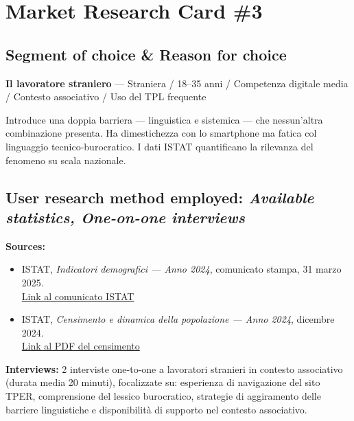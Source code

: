 ﻿\documentclass[11pt,a4paper]{article}
\begin{document}
\newpage
\section{Market Research Card \#3}

\subsection*{Segment of choice \& Reason for choice}
\begin{tcolorbox}[base]
\textbf{Il lavoratore straniero} --- Straniera / 18--35 anni /
Competenza digitale media / Contesto associativo / Uso del TPL
frequente

\vspace{0.2cm}
Introduce una doppia barriera --- linguistica e sistemica --- che
nessun'altra combinazione presenta. Ha dimestichezza con lo smartphone
ma fatica col linguaggio tecnico-burocratico. I dati ISTAT quantificano
la rilevanza del fenomeno su scala nazionale.
\end{tcolorbox}
\subsection*{User research method employed: \textit{Available statistics, One-on-one interviews}}
\begin{tcolorbox}[base]
\textbf{Sources:}
\begin{itemize}[leftmargin=*]
  \item ISTAT, \textit{Indicatori demografici --- Anno 2024},
  comunicato stampa, 31 marzo 2025.\\
  \href{https://www.istat.it/comunicato-stampa/indicatori-demografici-anno-2024/}{Link al comunicato ISTAT}

  \item ISTAT, \textit{Censimento e dinamica della popolazione --- Anno 2024}, dicembre 2024.\\
  \href{https://www.istat.it/wp-content/uploads/2025/12/Censimento-e-dinamica-della-popolazione-Anno-2024.pdf}{Link al PDF del censimento}
\end{itemize}

\vspace{0.2cm}
\textbf{Interviews:} 2 interviste one-to-one a lavoratori stranieri
in contesto associativo (durata media 20 minuti), focalizzate su:
esperienza di navigazione del sito TPER, comprensione del lessico
burocratico, strategie di aggiramento delle barriere linguistiche e
disponibilità di supporto nel contesto associativo.
\end{tcolorbox}
\end{document}
